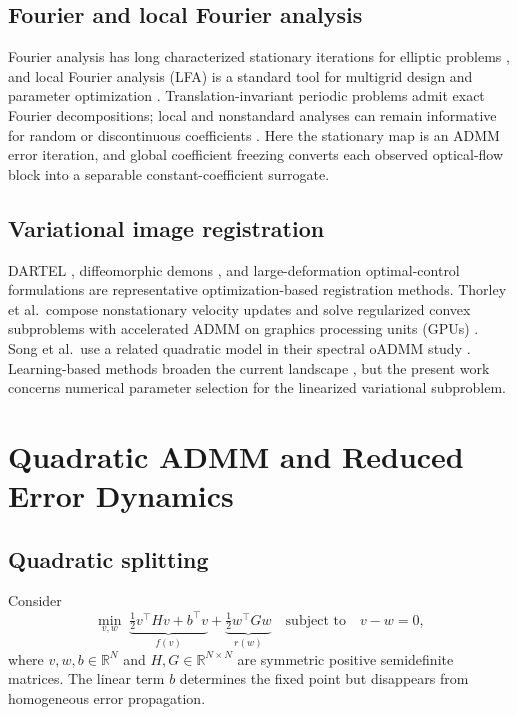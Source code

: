 \documentclass[pdflatex,iicol,sn-mathphys-num]{sn-jnl}
\theoremstyle{definition}
\newcommand{\R}{\mathbb{R}}
\begin{document}
\subsection{Fourier and local Fourier analysis}
Fourier analysis has long characterized stationary iterations for elliptic
problems \cite{ChanElman1989}, and local Fourier analysis (LFA) is a standard
tool for multigrid design and parameter optimization
\cite{WienandsJoppich2005}. Translation-invariant periodic problems admit exact
Fourier decompositions; local and nonstandard analyses can remain informative
for random or discontinuous coefficients \cite{Rodrigo2019,Kumar2019}. Here the
stationary map is an ADMM error iteration, and global coefficient freezing
converts each observed optical-flow block into a separable constant-coefficient
surrogate.

\subsection{Variational image registration}
DARTEL \cite{Ashburner2007}, diffeomorphic demons
\cite{Vercauteren2009}, and large-deformation optimal-control formulations
\cite{MangBiros2015} are representative optimization-based registration
methods. Thorley et al.\ compose nonstationary velocity updates and solve
regularized convex subproblems with accelerated ADMM on graphics processing
units (GPUs)
\cite{Thorley2021}. Song et al.\ use a related quadratic model in their spectral
oADMM study \cite{Song2024}. Learning-based methods broaden the current
landscape \cite{Hering2023}, but the present work concerns numerical parameter
selection for the linearized variational subproblem.

\section{Quadratic ADMM and Reduced Error Dynamics}\label{sec:quadratic}
\subsection{Quadratic splitting}
Consider
\begin{equation}
\min_{v,w}\;
\underbrace{\tfrac12v^\top Hv+b^\top v}_{f(v)}
+\underbrace{\tfrac12w^\top Gw}_{r(w)}
\quad\text{subject to}\quad v-w=0,
\label{eq:split}
\end{equation}
where $v,w,b\in\R^N$ and $H,G\in\R^{N\times N}$ are symmetric positive
semidefinite matrices. The linear term $b$ determines the fixed point but
disappears from homogeneous error propagation.
\end{document}
